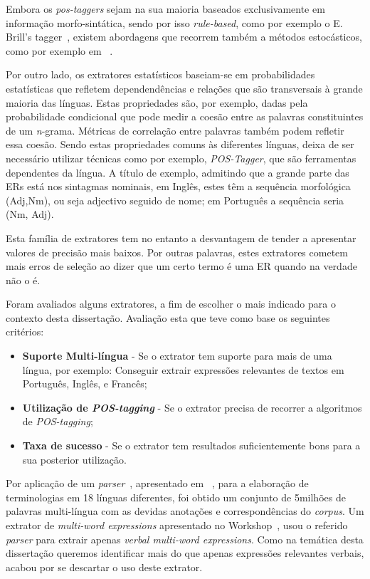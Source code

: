  Embora os \textit{pos-taggers} sejam na sua maioria baseados exclusivamente em informação morfo-sintática, sendo por isso  \textit{rule-based}, como por exemplo  o E. Brill's tagger~\cite{Brill:1992:SRP:974499.974526}, \thinspace existem abordagens que recorrem também a métodos estocásticos, como por exemplo em ~\cite{Church:1988:SPP:974235.974260}.

Por outro lado, os extratores estatísticos baseiam-se em probabilidades estatísticas que refletem dependendências e relações que são transversais à grande maioria das línguas. Estas propriedades são, por exemplo, dadas pela probabilidade condicional que pode medir a coesão entre as palavras constituintes de um \textit{n}-grama. Métricas de correlação entre palavras também podem refletir essa coesão. Sendo estas propriedades comuns às diferentes línguas, deixa de ser necessário utilizar técnicas como por exemplo, \textit{POS-Tagger}, que são ferramentas dependentes da língua. A título de exemplo, admitindo que a grande parte das ERs está nos sintagmas nominais, em Inglês, estes têm a sequência morfológica (Adj,Nm), ou seja adjectivo seguido de nome; em Português a sequência seria (Nm, Adj).

Esta família de extratores tem no entanto a desvantagem de tender a apresentar valores de precisão mais baixos. Por outras palavras, estes extratores cometem mais erros de seleção ao dizer que um certo termo é uma ER quando na verdade não o é.

Foram avaliados alguns extratores, a fim de escolher o mais indicado para o contexto desta dissertação. Avaliação esta que teve como base os seguintes critérios: 
\begin{itemize}
	\item \textbf{Suporte Multi-língua} - Se o extrator tem suporte para mais de uma língua, por exemplo: Conseguir extrair expressões relevantes de textos em Português, Inglês, e Francês;
	\item \textbf{Utilização de \textit{POS-tagging}} - Se o extrator precisa de recorrer a algoritmos de \textit{POS-tagging};
	\item \textbf{Taxa de sucesso} - Se o extrator tem resultados suficientemente bons para a sua posterior utilização.
\end{itemize}

Por aplicação de um \textit{parser}~\cite{W17-1704}, apresentado em ~\cite{W17-1700}, para a elaboração de terminologias em 18 línguas diferentes, foi obtido um conjunto de 5milhões de palavras multi-língua com as devidas anotações  e correspondências do \textit{corpus}. Um extrator de \textit{multi-word expressions} apresentado no Workshop~\cite{W17-1700}, usou o referido \textit{parser} para extrair apenas \textit{verbal multi-word expressions}. Como na temática desta dissertação queremos identificar mais do que apenas expressões relevantes verbais, acabou por se descartar o uso deste extrator.


